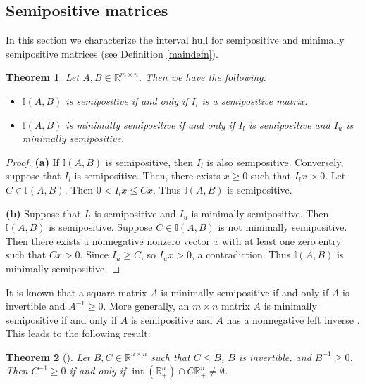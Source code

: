 \documentclass[11pt]{article}
\newtheorem{theorem}{Theorem}[section]
\DeclareMathOperator{\inte }{int}
\begin{document}
    \subsection{Semipositive matrices}\label{sec-semi}
In this section we characterize the interval hull for semipositive and minimally semipositive matrices (see Definition \ref{maindefn}).
\begin{theorem}\label{int-semi}
    Let $A,B \in \mathbb{R}^{m \times n}$. Then we have the following:
 \begin{itemize}
        \item[(a)] $\mathbb{I}(A,B)$ is semipositive  if and only if $I_l$ is a semipositive matrix.
        \item[(b)] $\mathbb{I}(A,B)$ is minimally semipositive if and only if $I_l$ is semipositive and $I_u$ is minimally semipositive.
\end{itemize}

\end{theorem}

\begin{proof}
    \textbf{(a)} If $\mathbb{I}(A,B)$ is semipositive, then $I_l$ is also semipositive. Conversely, suppose that $I_l$ is semipositive. Then, there exists $x\geq 0$ such that $I_lx>0$. Let $C \in \mathbb{I}(A,B)$. Then $0< I_l x\leq Cx$. Thus $\mathbb{I}(A,B)$ is semipositive.


    \textbf{(b)} Suppose that $I_l$ is semipositive and $I_u$ is minimally semipositive. Then $\mathbb{I}(A,B)$ is semipositive. Suppose
    $C \in\mathbb{I}(A,B)$ is not minimally semipositive. Then there exists a  nonnegative nonzero vector $x$ with at least one zero entry such that $Cx>0$. Since $I_u\geq C$, so $I_u x>0$, a contradiction. Thus $\mathbb{I}(A,B)$ is minimally semipositive.
\end{proof}

It is known that a square matrix $A$ is minimally semipositive if and
only if $A$ is invertible and $A^{-1}\geq 0$. More generally,  an $m \times n$ matrix $A$ is minimally semipositive  if and only if $A$ is semipositive and $A$ has a nonnegative left inverse \cite{john-ker-stan-semi}. This leads to the following result:

\begin{theorem}[{\cite[Theorem 25.4]{kras-lif-sob}}]\label{kras}
Let $B,C \in \mathbb{R} ^{n \times n}$ such that $C \leq B$, $B$ is
invertible, and $B^{-1}\geq 0$.
Then $C^{-1} \geq 0$ if and only if $\inte(\mathbb{R}_+^n) \cap C\mathbb{R}_+^n \neq \emptyset$.
\end{theorem}
\end{document}
